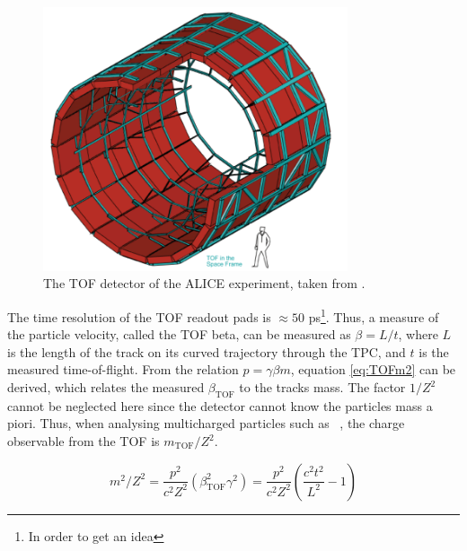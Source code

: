 \begin{figure}
    \centering
    \includegraphics[width=0.8\textwidth]{figures/TOF.png}
    \caption{The TOF detector of the ALICE experiment, taken from \cite{}.}
    \label{fig:TOF_schematic}
\end{figure}

The time resolution of the TOF readout pads is $\approx 50$ ps\footnote{In order to get an idea }.
Thus, a measure of the particle velocity, called the TOF beta, can be measured as $\beta = L/t$, where $L$ is the length of the track on its curved trajectory through the TPC, and $t$ is the measured time-of-flight. From the relation $p = \gamma \beta m$, equation \ref{eq:TOFm2} can be derived, which relates the measured $\beta_{\mathrm{TOF}}$ to the tracks mass. The factor $1/Z^2$ cannot be neglected here since the detector cannot know the particles mass a piori. Thus, when analysing multicharged particles such as \ahe\ , the charge observable from the TOF is $m_{\mathrm{TOF}}/Z^2$. 

\begin{equation}\label{eq:TOFm2}
    m^2/Z^2 = \frac{p^2}{c^2 Z^2}\left(\beta_{\mathrm{TOF}}^2\gamma^2 \right) = \frac{p^2}{c^2 Z^2} \left( \frac{c^2t^2}{L^2} -1\right)
\end{equation}

